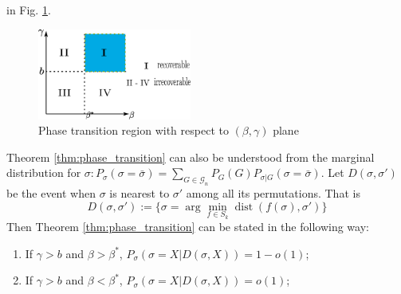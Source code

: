 \documentclass[entropy,article,submit,moreauthors,pdftex]{Definitions/mdpi}
\newcommand{\cG}{\mathcal{G}}
\newcommand{\1}{\mathbbm{1}}
\DeclareMathOperator{\Dist}{dist}
\begin{document}
in Fig. \ref{fig:pt}.
\begin{figure}
	\centering
	\includegraphics[width=0.45\textwidth]{phase_trans.eps}
	\caption{Phase transition region with respect to $(\beta, \gamma)$ plane}\label{fig:pt}
\end{figure}

Theorem
\ref{thm:phase_transition} can also be understood from the marginal distribution for $\sigma: P_{\sigma}(\sigma =\bar{\sigma})
=\sum_{G \in \cG_n}P_G(G)P_{\sigma |G}(\sigma=\bar{\sigma})$.
Let $D(\sigma, \sigma')$ be the event when $\sigma$ is nearest to $\sigma'$ among all its permutations.
That is
\begin{equation}
D(\sigma, \sigma') := \{ \sigma = \arg\min_{f \in S_k} \Dist(f(\sigma), \sigma')  \}
\end{equation}
Then Theorem \ref{thm:phase_transition} can be stated in the following way:
\begin{Corollary}\label{cor:phase4}
\begin{enumerate}
	\item If $\gamma > b$ and $\beta > \beta^*$, $P_{\sigma}(\sigma = X | D(\sigma, X))  = 1-o(1)$;
	\item If $\gamma > b$ and $\beta < \beta^*$, $P_{\sigma}(\sigma = X | D(\sigma, X))  = o(1)$;
\end{enumerate}
\end{Corollary}
\end{document}
